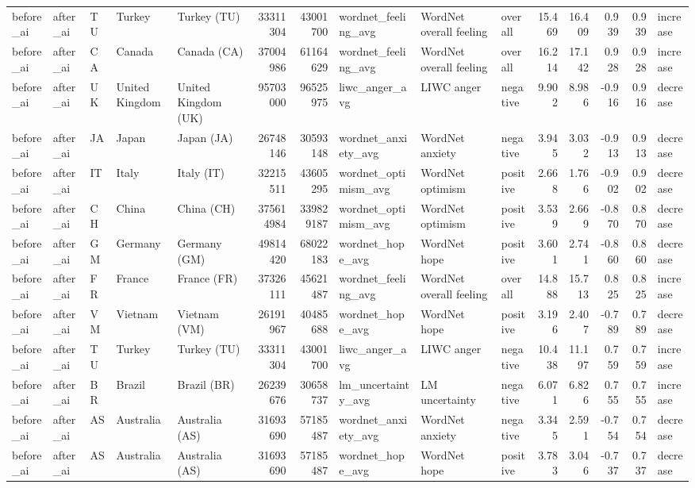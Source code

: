 \begin{tabular}{lllllrrlllrrrrl}
before\_ai & after\_ai & TU & Turkey & Turkey (TU) & 33311304 & 43001700 & wordnet\_feeling\_avg & WordNet overall feeling & overall & 15.469 & 16.409 & 0.939 & 0.939 & increase \\
before\_ai & after\_ai & CA & Canada & Canada (CA) & 37004986 & 61164629 & wordnet\_feeling\_avg & WordNet overall feeling & overall & 16.214 & 17.142 & 0.928 & 0.928 & increase \\
before\_ai & after\_ai & UK & United Kingdom & United Kingdom (UK) & 95703000 & 96525975 & liwc\_anger\_avg & LIWC anger & negative & 9.902 & 8.986 & -0.916 & 0.916 & decrease \\
before\_ai & after\_ai & JA & Japan & Japan (JA) & 26748146 & 30593148 & wordnet\_anxiety\_avg & WordNet anxiety & negative & 3.945 & 3.032 & -0.913 & 0.913 & decrease \\
before\_ai & after\_ai & IT & Italy & Italy (IT) & 32215511 & 43605295 & wordnet\_optimism\_avg & WordNet optimism & positive & 2.668 & 1.766 & -0.902 & 0.902 & decrease \\
before\_ai & after\_ai & CH & China & China (CH) & 375614984 & 339829187 & wordnet\_optimism\_avg & WordNet optimism & positive & 3.539 & 2.669 & -0.870 & 0.870 & decrease \\
before\_ai & after\_ai & GM & Germany & Germany (GM) & 49814420 & 68022183 & wordnet\_hope\_avg & WordNet hope & positive & 3.601 & 2.741 & -0.860 & 0.860 & decrease \\
before\_ai & after\_ai & FR & France & France (FR) & 37326111 & 45621487 & wordnet\_feeling\_avg & WordNet overall feeling & overall & 14.888 & 15.713 & 0.825 & 0.825 & increase \\
before\_ai & after\_ai & VM & Vietnam & Vietnam (VM) & 26191967 & 40485688 & wordnet\_hope\_avg & WordNet hope & positive & 3.196 & 2.407 & -0.789 & 0.789 & decrease \\
before\_ai & after\_ai & TU & Turkey & Turkey (TU) & 33311304 & 43001700 & liwc\_anger\_avg & LIWC anger & negative & 10.438 & 11.197 & 0.759 & 0.759 & increase \\
before\_ai & after\_ai & BR & Brazil & Brazil (BR) & 26239676 & 30658737 & lm\_uncertainty\_avg & LM uncertainty & negative & 6.071 & 6.826 & 0.755 & 0.755 & increase \\
before\_ai & after\_ai & AS & Australia & Australia (AS) & 31693690 & 57185487 & wordnet\_anxiety\_avg & WordNet anxiety & negative & 3.345 & 2.591 & -0.754 & 0.754 & decrease \\
before\_ai & after\_ai & AS & Australia & Australia (AS) & 31693690 & 57185487 & wordnet\_hope\_avg & WordNet hope & positive & 3.783 & 3.046 & -0.737 & 0.737 & decrease \\

\end{tabular}

